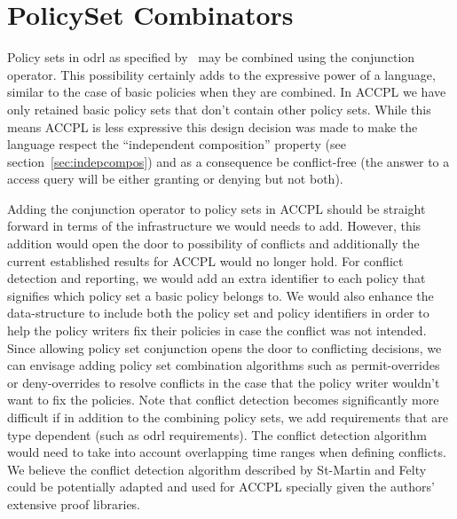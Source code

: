 \section{PolicySet Combinators}  

Policy sets in \ac{odrl} as specified by~\cite{pucella2006} may be combined using the conjunction operator. This possibility certainly adds to the expressive power of a language, similar to the case of basic policies when they are combined. In \ac{ACCPL} we have only retained basic policy sets that don't contain other policy sets. While this means \ac{ACCPL} is less expressive this design decision was made to make the language respect the ``independent composition'' property (see section~\ref{sec:indepcompos}) and as a consequence be conflict-free (the answer to a access query will be either granting or denying but not both). 

Adding the conjunction operator to policy sets in \ac{ACCPL} should be straight forward in terms of the infrastructure we would needs to add. However, this addition would open the door to possibility of conflicts and additionally the current established results for \ac{ACCPL} would no longer hold. For conflict detection and reporting, we would add an extra identifier to each policy that signifies which policy set a basic policy belongs to. We would also enhance the  data-structure to include both the policy set and policy identifiers in order to help the policy writers fix their policies in case the conflict was not intended. Since allowing policy set conjunction opens the door to conflicting decisions, we can envisage adding policy set combination algorithms such as permit-overrides or deny-overrides to resolve conflicts in the case that the policy writer wouldn't want to fix the policies. Note that conflict detection becomes significantly more difficult if in addition to the combining policy sets, we add requirements that are type dependent (such as \ac{odrl} requirements). The conflict detection algorithm would need to take into account overlapping time ranges when defining conflicts. We believe the conflict detection algorithm described by St-Martin and Felty~\cite{felty16} could be potentially adapted and used for \ac{ACCPL} specially given the authors' extensive proof libraries. 

